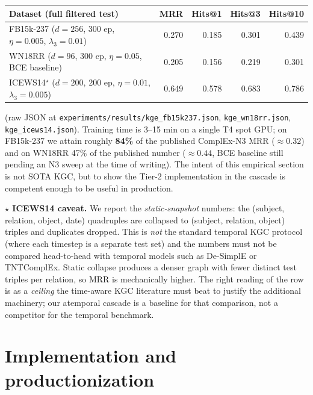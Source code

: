 \documentclass[11pt]{article}
\theoremstyle{plain}
\begin{document}
\begin{center}\small
\begin{tabular}{lrrrr}
\toprule
Dataset (full filtered test) & MRR & Hits@1 & Hits@3 & Hits@10 \\
\midrule
FB15k-237 ($d=256$, 300 ep, $\eta=0.005$, $\lambda_3=0.01$)
                                                  & 0.270 & 0.185 & 0.301 & 0.439 \\
WN18RR    ($d=96$,  300 ep, $\eta=0.05$, BCE baseline)
                                                  & 0.205 & 0.156 & 0.219 & 0.301 \\
ICEWS14$^\star$ ($d=200$, 200 ep, $\eta=0.01$, $\lambda_3=0.005$)
                                                  & 0.649 & 0.578 & 0.683 & 0.786 \\
\bottomrule
\end{tabular}
\end{center}

{\sloppy\noindent (raw JSON at \texttt{experiments/results/kge\_fb15k237.json},
\texttt{kge\_wn18rr.json}, \texttt{kge\_icews14.json}).  Training time
is 3--15 min on a single T4 spot GPU; on FB15k-237 we attain
roughly \textbf{84\%} of the published ComplEx-N3 MRR
($\approx 0.32$) and on WN18RR 47\% of the published number
($\approx 0.44$, BCE baseline still pending an N3 sweep at the time
of writing).  The intent of this empirical section is not SOTA KGC,
but to show the Tier-2 implementation in the cascade is competent
enough to be useful in production.\par}

\par\noindent\textbf{$\star$ ICEWS14 caveat.} We report the
\emph{static-snapshot} numbers: the (subject, relation, object, date)
quadruples are collapsed to (subject, relation, object) triples and
duplicates dropped.  This is \emph{not} the standard temporal KGC
protocol (where each timestep is a separate test set) and the
numbers must not be compared head-to-head with temporal models such
as De-SimplE \cite{garcia2020desimple} or TNTComplEx.  Static
collapse produces a denser graph with fewer distinct test triples
per relation, so MRR is mechanically higher.  The right reading of
the row is as a \emph{ceiling} the time-aware KGC literature must
beat to justify the additional machinery; our atemporal cascade is
a baseline for that comparison, not a competitor for the temporal
benchmark.

\section{Implementation and productionization}
\label{sec:implementation}
\end{document}
